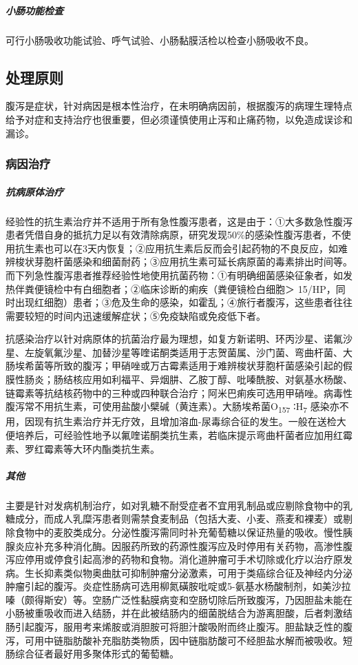 \subparagraph{小肠功能检查}

可行小肠吸收功能试验、呼气试验、小肠黏膜活检以检查小肠吸收不良。

\subsection{处理原则}

腹泻是症状，针对病因是根本性治疗，在未明确病因前，根据腹泻的病理生理特点给予对症和支持治疗也很重要，但必须谨慎使用止泻和止痛药物，以免造成误诊和漏诊。

\subsubsection{病因治疗}

\subparagraph{抗病原体治疗}

经验性的抗生素治疗并不适用于所有急性腹泻患者，这是由于：①大多数急性腹泻患者凭借自身的抵抗力足以有效清除病原，研究发现50\%的感染性腹泻患者，不使用抗生素也可以在3天内恢复；②应用抗生素后反而会引起药物的不良反应，如难辨梭状芽胞杆菌感染和细菌耐药；③应用抗生素可延长病原菌的毒素排出时间等。而下列急性腹泻患者推荐经验性地使用抗菌药物：①有明确细菌感染征象者，如发热伴粪便镜检中有白细胞者；②临床诊断的痢疾（粪便镜检白细胞＞
15/HP，同时出现红细胞）患者；③危及生命的感染，如霍乱；④旅行者腹泻，这些患者往往需要较短的时间内迅速缓解症状；⑤免疫缺陷或免疫低下者。

抗感染治疗以针对病原体的抗菌治疗最为理想，如复方新诺明、环丙沙星、诺氟沙星、左旋氧氟沙星、加替沙星等喹诺酮类适用于志贺菌属、沙门菌、弯曲杆菌、大肠埃希菌等所致的腹泻；甲硝唑或万古霉素适用于难辨梭状芽胞杆菌感染引起的假膜性肠炎；肠结核应用如利福平、异烟肼、乙胺丁醇、吡嗪酰胺、对氨基水杨酸、链霉素等抗结核药物中的三种或四种联合治疗；阿米巴痢疾可选用甲硝唑。病毒性腹泻常不用抗生素，可使用盐酸小檗碱（黄连素）。大肠埃希菌O\textsubscript{157}
∶H\textsubscript{7}
感染亦不用，因现有抗生素治疗并无疗效，且增加溶血-尿毒综合征的发生。一般在送检大便培养后，可经验性地予以氟喹诺酮类抗生素，若临床提示弯曲杆菌者应加用红霉素、罗红霉素等大环内酯类抗生素。

\subparagraph{其他}

主要是针对发病机制治疗，如对乳糖不耐受症者不宜用乳制品或应剔除食物中的乳糖成分，而成人乳糜泻患者则需禁食麦制品（包括大麦、小麦、燕麦和裸麦）或剔除食物中的麦胶类成分。分泌性腹泻需同时补充葡萄糖以保证热量的吸收。慢性胰腺炎应补充多种消化酶。因服药所致的药源性腹泻应及时停用有关药物，高渗性腹泻应停用或停食引起高渗的药物和食物。消化道肿瘤可手术切除或化疗以治疗原发病。生长抑素类似物奥曲肽可抑制肿瘤分泌激素，可用于类癌综合征及神经内分泌肿瘤引起的腹泻。炎症性肠病可选用柳氮磺胺吡啶或5-氨基水杨酸制剂，如美沙拉嗪（颇得斯安）等。空肠广泛性黏膜病变和空肠切除后所致腹泻，乃因胆盐未能在小肠被重吸收而进入结肠，并在此被结肠内的细菌脱结合为游离胆酸，后者刺激结肠引起腹泻，服用考来烯胺或消胆胺可将胆汁酸吸附而终止腹泻。胆盐缺乏性的腹泻，可用中链脂肪酸补充脂肪类物质，因中链脂肪酸可不经胆盐水解而被吸收。短肠综合征者最好用多聚体形式的葡萄糖。


